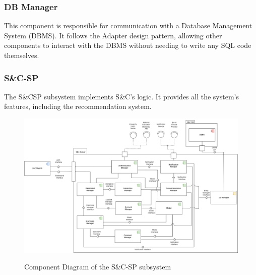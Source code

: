 \documentclass[a4paper,12pt]{article}
\begin{document}
\subsubsection{DB Manager}
This component is responsible for communication with a Database Management System (DBMS).
It follows the Adapter design pattern, allowing other components to interact with the DBMS
without needing to write any SQL code themselves.
\subsubsection{S\&C-SP}
The S\&CSP subsystem implements S\&C's logic. It provides all the system's features, including the recommendation system.
\begin{figure}%
\centering
\includegraphics[scale=0.50]{DD_figures/S&C.drawio.png}\\
\caption{Component Diagram of the S\&C-SP subsystem}
\end{figure}
\end{document}
